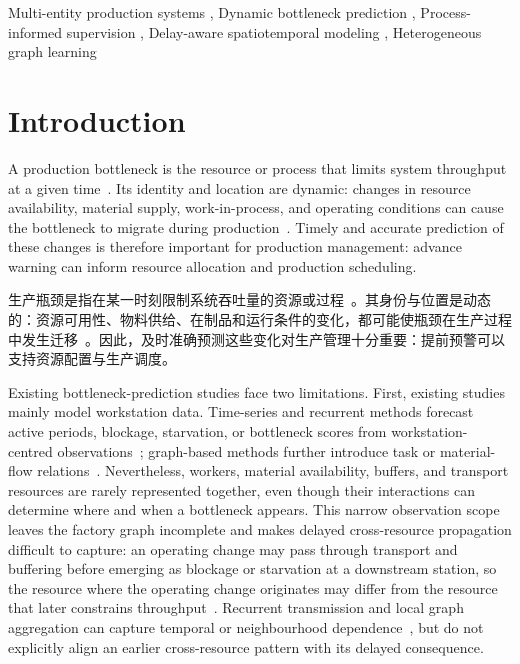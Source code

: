 \documentclass[a4paper,fleqn]{cas-dc}
\newcommand{\zhpara}[1]{%
  \par\begingroup\small\color{black!72}\noindent #1\par\endgroup}
\begin{document}
\begin{keywords}
Multi-entity production systems \sep
Dynamic bottleneck prediction \sep
Process-informed supervision \sep
Delay-aware spatiotemporal modeling \sep
Heterogeneous graph learning
\end{keywords}

\begin{NoHyper}
\maketitle
\end{NoHyper}

\section{Introduction} \label{sec:intro}

A production bottleneck is the resource or process that limits system throughput at a given time~\cite{subramaniyan2023throughput,tang2024comprehensive}. Its identity and location are dynamic: changes in resource availability, material supply, work-in-process, and operating conditions can cause the bottleneck to migrate during production~\cite{lai2021data}. Timely and accurate prediction of these changes is therefore important for production management: advance warning can inform resource allocation and production scheduling.

\zhpara{生产瓶颈是指在某一时刻限制系统吞吐量的资源或过程~\cite{subramaniyan2023throughput,tang2024comprehensive}。其身份与位置是动态的：资源可用性、物料供给、在制品和运行条件的变化，都可能使瓶颈在生产过程中发生迁移~\cite{lai2021data}。因此，及时准确预测这些变化对生产管理十分重要：提前预警可以支持资源配置与生产调度。}


Existing bottleneck-prediction studies face two limitations. First, existing studies mainly model workstation data. Time-series and recurrent methods forecast active periods, blockage, starvation, or bottleneck scores from workstation-centred observations~\cite{li2011throughput,subramaniyan2018data,lai2018twolayer,liu2023lstmdam}; graph-based methods further introduce task or material-flow relations~\cite{lai2023bstan,yin2025btgcn,ma2023tusb,cen2025dstnn,wu2025knowledge}. Nevertheless, workers, material availability, buffers, and transport resources are rarely represented together, even though their interactions can determine where and when a bottleneck appears. This narrow observation scope leaves the factory graph incomplete and makes delayed cross-resource propagation difficult to capture: an operating change may pass through transport and buffering before emerging as blockage or starvation at a downstream station, so the resource where the operating change originates may differ from the resource that later constrains throughput~\cite{gu2015passive,zhang2022vulnerability}. Recurrent transmission and local graph aggregation can capture temporal or neighbourhood dependence~\cite{liu2023lstmdam,yin2025btgcn}, but do not explicitly align an earlier cross-resource pattern with its delayed consequence.
\end{document}
